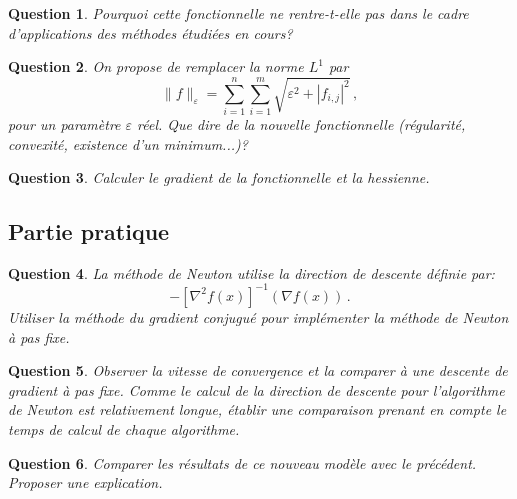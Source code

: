 \documentclass[10pt,a4paper,fleqn]{report}
\newtheorem{question}{Question}
\begin{document}
\begin{question}
Pourquoi cette fonctionnelle ne rentre-t-elle pas dans le cadre d'applications des m\'ethodes \'etudi\'ees en cours?
\end{question}

\begin{question}
On propose de remplacer la norme $L^1$ par
\begin{equation}
\| f \|_{\varepsilon} = \sum_{i=1}^n \sum_{i=1}^m \sqrt{\varepsilon^2 + |f_{i,j}|^2} \,,
\end{equation}
pour un param\`etre $\varepsilon$ r\'eel.
Que dire de la nouvelle fonctionnelle (r\'egularit\'e, convexit\'e, existence d'un minimum...)?
\end{question}

\begin{question}
Calculer le gradient de la fonctionnelle et la hessienne.
\end{question}

\subsection{Partie pratique}

\begin{question}
La m\'ethode de Newton utilise la direction de descente d\'efinie par:
$$ -[\nabla^2f(x)]^{-1}(\nabla f(x))\,.$$
Utiliser la m\'ethode du gradient conjugu\'e pour impl\'ementer la m\'ethode de Newton \`a pas fixe.
\end{question}

\begin{question}
Observer la vitesse de convergence et la comparer \`a une descente de gradient \`a pas fixe.
Comme le calcul de la direction de descente pour l'algorithme de Newton est relativement longue, \'etablir une comparaison prenant en compte le temps de calcul de chaque algorithme.
\end{question}

\begin{question}
Comparer les r\'esultats de ce nouveau mod\`ele avec le pr\'ec\'edent. Proposer une explication.
\end{question}
\end{document}
